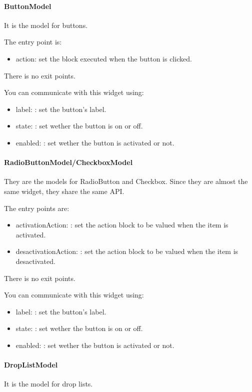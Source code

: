 \documentclass[a4paper,10pt,twoside]{book}
\begin{document}
\paragraph{ButtonModel} It is the model for buttons.

The entry point is:
\begin{itemize}
	\item action: set the block executed when the button is clicked.
\end{itemize}	
There is no exit points.	

You can communicate with this widget using:
\begin{itemize}		
	\item label: : set the button's label.
	\item state: : set wether the button is on or off.
	\item enabled: : set wether the button is activated or not.
\end{itemize}

\paragraph{RadioButtonModel/CheckboxModel} They are the models for RadioButton and Checkbox. Since they are almost the same widget, they share the same API.

The entry points are:
\begin{itemize}
	\item activationAction: : set the action block to be valued when the item is activated.
	\item desactivationAction: : set the action block to be valued when the item is desactivated.
\end{itemize}

There is no exit points.	

You can communicate with this widget using:
\begin{itemize}		
	\item label: : set the button's label.
	\item state: : set wether the button is on or off.
	\item enabled: : set wether the button is activated or not.
\end{itemize}

\paragraph{DropListModel} It is the model for drop lists.
\end{document}
